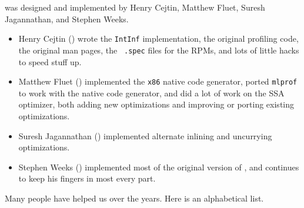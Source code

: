 
{\mlton} was designed and implemented by Henry Cejtin, Matthew Fluet, Suresh
Jagannathan, and Stephen Weeks.

\begin{itemize}

\item
Henry Cejtin () wrote the {\tt IntInf}
implementation, the original profiling code, the original man pages, the {\tt
.spec} files for the RPMs, and lots of little hacks to speed stuff up.

\item
Matthew Fluet () implemented the {\tt x86} native
code generator, ported {\tt mlprof} to work with the native code generator, and
did a lot of work on the SSA optimizer, both adding new optimizations and
improving or porting existing optimizations.

\item
Suresh Jagannathan () implemented
alternate inlining and uncurrying optimizations.

\item
Stephen Weeks () implemented most of the original
version of {\mlton}, and continues to keep his fingers in most every part.

\end{itemize}

Many people have helped us over the years.  Here is an alphabetical list.

